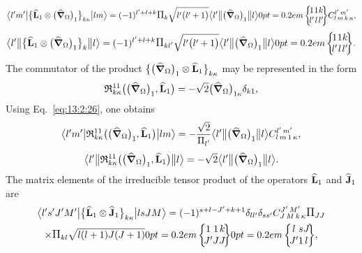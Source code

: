 \begin{equation} 
\braOket{ l^{\prime} m^{\prime}}{\bigl\{\widehat{\vect{L}}_{1} \otimes\bigl(\delop_{\Omega}\bigr)_{1}\bigr\}_{k \kappa}}{l m}=(-1)^{l^{\prime}+l+k} \Fact{k}\sqrt{ l^{\prime}\bigl(l^{\prime}+1\bigr)}
\braOketred{ l^{\prime}}{\bigl(\delop_{\Omega}\bigr)_{1}}{ l}
\sixj{1}{1}{k}{l^{\prime}}{l}{l^{\prime}}
\clebsch{l}{m}{k}{\kappa}{l^{\prime}}{m^{\prime}}, \label{eq:13:2:83}
\end{equation}
\begin{equation*}
\braOketred{ l^{\prime}}{\bigl\{\widehat{\vect{L}}_{1} \otimes\bigl(\delop_{\Omega}\bigr)_{1}\bigr\}_{k}}{ l}=(-1)^{l^{\prime}+l+k} \Fact{k l^{\prime}}\sqrt{ l^{\prime}\bigl(l^{\prime}+1\bigr)}
\braOketred{ l^{\prime}}{\bigl(\delop_{\Omega}\bigr)_{1}}{ l}
\sixj{1}{1}{k}{l^{\prime}}{l}{l^{\prime}} .
\end{equation*}
The commutator of the product \(\bigl\{\bigl(\widehat{\boldsymbol{\nabla}}_{\Omega}\bigr)_{1} \otimes \widehat{\mathbf{L}}_{1}\bigr\}_{k \kappa}\) may be represented in the form
\begin{equation}
\mathfrak{R}_{k \kappa}^{11}\bigl(\bigl(\widehat{\boldsymbol{\nabla}}_{\Omega}\bigr)_{1}, \widehat{\mathbf{L}}_{1}\bigr)=-\sqrt{2}\bigl(\widehat{\boldsymbol{\nabla}}_{\Omega}\bigr)_{1 \kappa} \delta_{k 1}, \label{eq:13:2:84}
\end{equation}
Using Eq.~\eqref{eq:13:2:26}, one obtains
\begin{equation}
\braOket{ l^{\prime} m^{\prime}}{ \mathfrak{R}_{k \kappa}^{11}\bigl(\bigl(\delop_{\Omega}\bigr)_{1}, \widehat{\vect{L}}_{1}\bigr)}{l m}=-\frac{\sqrt{2}}{\Fact{l^{\prime}}}
\braOketred{ l^{\prime}}{\bigl(\delop_{\Omega}\bigr)_{1}}{ l}
\clebsch{l}{m}{1}{\kappa}{l^{\prime}}{m^{\prime}} , \label{eq:13:2:85}
\end{equation}
\begin{equation*}
\bigl\langle  l^{\prime} \big\Vert  \mathfrak{R}_{k \kappa}^{11}\bigl(\bigl(\widehat{\boldsymbol{\nabla}}_{\Omega}\bigr)_{1}, \widehat{\mathbf{L}}_{1}\bigr) \big\Vert l \bigr\rangle=-\sqrt{2}
\bigl\langle  l^{\prime} \big\Vert \bigl(\widehat{\boldsymbol{\nabla}}_{\Omega}\bigr)_{1} \big\Vert  l \bigr\rangle
 . 
\end{equation*}
The matrix elements of the irreducible tensor product of the operators \(\widehat{\mathbf{L}}_{1}\) and \(\widehat{\mathbf{J}}_{1}\) are
\begin{multline}
\braOket{ l^{\prime} s^{\prime} J^{\prime} M^{\prime}}{\bigl\{\widehat{\vect{L}}_{1} \otimes \widehat{\vect{J}}_{1}\bigr\}_{k \kappa}}{l s J M}=(-1)^{s+l-J^{\prime}+k+1} \delta_{l l^{\prime}} \delta_{s s^{\prime}}
\clebsch{J}{M}{k}{\kappa}{J^{\prime}}{M^{\prime}}\Fact{J J} \\
\times \Fact{k l}\sqrt{ l(l+1) J(J+1)}
\sixj{1}{1}{k}{J^{\prime}}{J}{J}
\sixj{l}{s}{J}{J^{\prime}}{1}{l},  \label{eq:13:2:86}
\end{multline}
